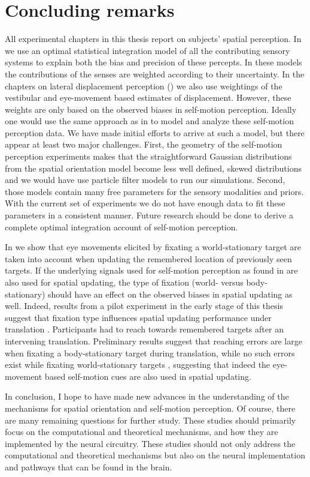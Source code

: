 \section{Concluding remarks}

All experimental chapters in this thesis report on subjects’ spatial perception. In  we use an optimal statistical integration model of all the contributing sensory systems to explain both the bias and precision of these percepts. In these models the contributions of the senses are weighted according to their uncertainty. In the chapters on lateral displacement perception () we also use weightings of the vestibular and eye-movement based estimates of displacement. However, these weights are only based on the observed biases in self-motion perception. Ideally one would use the same approach as in  to model and analyze these self-motion perception data. We have made initial efforts to arrive at such a model, but there appear at least two major challenges. First, the geometry of the self-motion perception experiments makes that the straightforward Gaussian distributions from the spatial orientation model become less well defined, skewed distributions and we would have use particle filter models to run our simulations. Second, those models contain many free parameters for the sensory modalities and priors. With the current set of experiments we do not have enough data to fit these parameters in a consistent manner. Future research should be done to derive a complete optimal integration account of self-motion perception.

In  we show that eye movements elicited by fixating a world-stationary target are taken into account when updating the remembered location of previously seen targets.  If the underlying signals used for self-motion perception as found in  are also used for spatial updating, the type of fixation (world- versus body-stationary) should have an effect on the observed biases in spatial updating as well. Indeed, results from a pilot experiment in the early stage of this thesis suggest that fixation type influences spatial updating performance under translation \cite{Clemens2010}. Participants had to reach towards remembered targets after an intervening translation. Preliminary results suggest that reaching errors are large when fixating a body-stationary target during translation, while no such errors exist while fixating world-stationary targets \cite{clemens2010}, suggesting that indeed the eye-movement based self-motion cues are also used in spatial updating.

In conclusion, I hope to have made new advances in the understanding of the mechanisms for spatial orientation and self-motion perception. Of course, there are many remaining questions for further study. These studies should primarily focus on the computational and theoretical mechanisms, and how they are implemented by the neural circuitry. These studies should not only address the computational and theoretical mechanisms but also on the neural implementation and pathways that can be found in the brain.

 